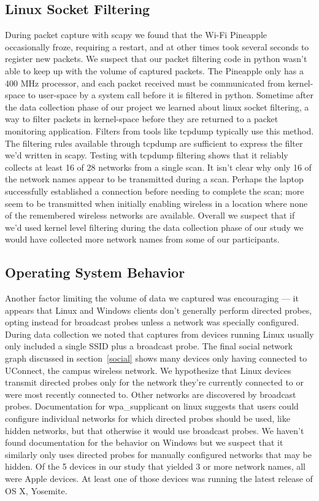\documentclass[letterpaper,twocolumn,10pt]{article}
\begin{document}
\subsection{Linux Socket Filtering}
During packet capture with scapy we found that the Wi-Fi Pineapple occasionally froze, requiring a restart, and at other times took several seconds to register new packets. We suspect that our packet filtering code in python wasn't able to keep up with the volume of captured packets. The Pineapple only has a 400 MHz processor, and each packet received must be communicated from kernel-space to user-space by a system call before it is filtered in python. Sometime after the data collection phase of our project we learned about linux socket filtering, a way to filter packets in kernel-space before they are returned to a packet monitoring application. Filters from tools like tcpdump typically use this method. The filtering rules available through tcpdump are sufficient to express the filter we'd written in scapy. Testing with tcpdump filtering shows that it reliably collects at least 16 of 28 networks from a single scan. It isn't clear why only 16 of the network names appear to be transmitted during a scan. Perhaps the laptop successfully established a connection before needing to complete the scan; more seem to be transmitted when initially enabling wireless in a location where none of the remembered wireless networks are available. Overall we suspect that if we'd used kernel level filtering during the data collection phase of our study we would have collected more network names from some of our participants.

\subsection{Operating System Behavior}
Another factor limiting the volume of data we captured was encouraging --- it appears that Linux and Windows clients don't generally perform directed probes, opting instead for broadcast probes unless a network was specially configured. During data collection we noted that captures from devices running Linux usually only included a single SSID plus a broadcast probe. The final social network graph discussed in section~\ref{social} shows many devices only having connected to UConnect, the campus wireless network. We hypothesize that Linux devices transmit directed probes only for the network they're currently connected to or were most recently connected to. Other networks are discovered by broadcast probes. Documentation for wpa\_supplicant on linux suggests that users could configure individual networks for which directed probes should be used, like hidden networks, but that otherwise it would use broadcast probes. We haven't found documentation for the behavior on Windows but we suspect that it similarly only uses directed probes for manually configured networks that may be hidden. Of the 5 devices in our study that yielded 3 or more network names, all were Apple devices. At least one of those devices was running the latest release of OS X, Yosemite.
\end{document}
